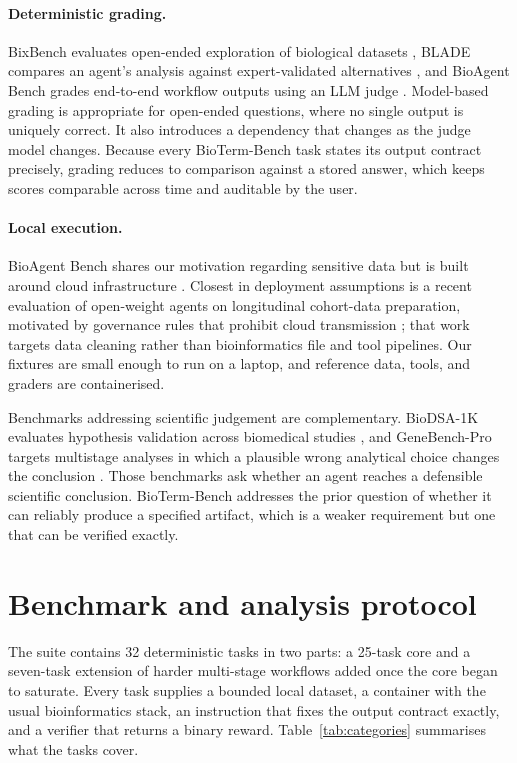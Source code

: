 \documentclass[11pt]{article}
\begin{document}
\paragraph{Deterministic grading.}
BixBench evaluates open-ended exploration of biological datasets \citep{mitchener2025bixbench}, BLADE compares an agent's analysis against expert-validated alternatives \citep{gu2024blade}, and BioAgent Bench grades end-to-end workflow outputs using an LLM judge \citep{fa2026bioagentbench}.
Model-based grading is appropriate for open-ended questions, where no single output is uniquely correct.
It also introduces a dependency that changes as the judge model changes.
Because every BioTerm-Bench task states its output contract precisely, grading reduces to comparison against a stored answer, which keeps scores comparable across time and auditable by the user.

\paragraph{Local execution.}
BioAgent Bench shares our motivation regarding sensitive data but is built around cloud infrastructure \citep{fa2026bioagentbench}.
Closest in deployment assumptions is a recent evaluation of open-weight agents on longitudinal cohort-data preparation, motivated by governance rules that prohibit cloud transmission \citep{nixon2026nocloud}; that work targets data cleaning rather than bioinformatics file and tool pipelines.
Our fixtures are small enough to run on a laptop, and reference data, tools, and graders are containerised.

Benchmarks addressing scientific judgement are complementary.
BioDSA-1K evaluates hypothesis validation across biomedical studies \citep{wang2025biodsa}, and GeneBench-Pro targets multistage analyses in which a plausible wrong analytical choice changes the conclusion \citep{li2026genebenchpro}.
Those benchmarks ask whether an agent reaches a defensible scientific conclusion.
BioTerm-Bench addresses the prior question of whether it can reliably produce a specified artifact, which is a weaker requirement but one that can be verified exactly.

\section{Benchmark and analysis protocol}

The suite contains 32 deterministic tasks in two parts: a 25-task core and a seven-task extension of harder multi-stage workflows added once the core began to saturate.
Every task supplies a bounded local dataset, a container with the usual bioinformatics stack, an instruction that fixes the output contract exactly, and a verifier that returns a binary reward.
Table~\ref{tab:categories} summarises what the tasks cover.
\end{document}
